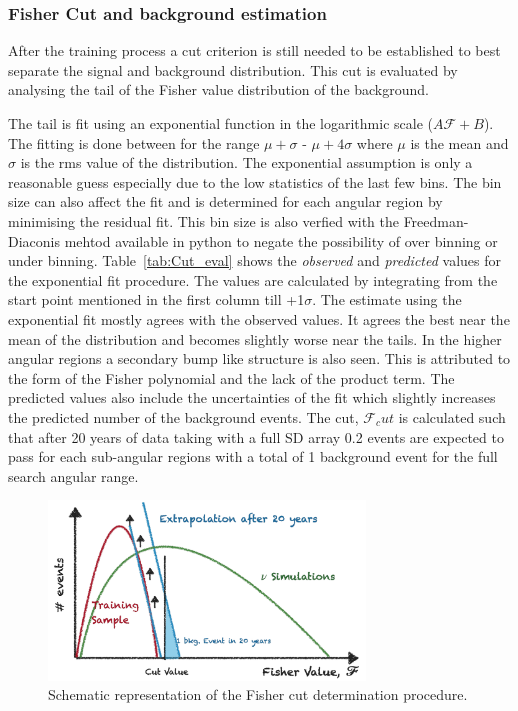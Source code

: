 \subsubsection{Fisher Cut and background estimation}
\label{subsubsec:nu_sel_fisher_cut}
After the training process a cut criterion is still needed to be established to best separate the signal and background distribution. This cut is evaluated by analysing the tail of the Fisher value distribution of the background. 

The tail is fit using an exponential function in the logarithmic scale ($A \mathcal{F} + B$). The fitting is done between for the range $\mu + \sigma$ - $\mu + 4\sigma$ where $\mu$ is the mean and $\sigma$ is the rms value of the distribution. The exponential assumption is only a reasonable guess especially due to the low statistics of the last few bins. The bin size can also affect the fit and is determined for each angular region by minimising the residual fit. This bin size is also verfied with the Freedman-Diaconis mehtod available in python to negate the possibility of over binning or under binning. Table~\ref{tab:Cut_eval} shows the \textit{observed} and \textit{predicted} values for the exponential fit procedure. The values are calculated by integrating from the start point mentioned in the first column till +1$\sigma$. The estimate using the exponential fit mostly agrees with the observed values. It agrees the best near the mean of the distribution and becomes slightly worse near the tails. In the higher angular regions a secondary bump like structure is also seen. This is attributed to the form of the Fisher polynomial and the lack of the product term. The predicted values also include the uncertainties of the fit which slightly increases the predicted number of the background events. The cut, $\mathcal{F}_cut$ is calculated such that after 20 years of data taking with a full SD array 0.2 events are expected to pass for each sub-angular regions with a total of 1 background event for the full search angular range. 

\begin{figure}[t!]
  \centering
  \includegraphics[width=0.75\textwidth]{thesis_figures/Nu_analysis/Fisher_cut_schematic.pdf}
  \caption{Schematic representation of the Fisher cut determination procedure.}
  \label{fig:Fish_cut_schem}
\end{figure}

